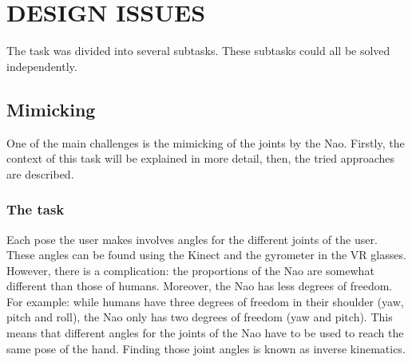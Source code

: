 \documentclass[letterpaper, 10pt, conference]{ieeeconf}
\begin{document}
\section{DESIGN ISSUES}
\label{sec:design}
The task was divided into several subtasks. These subtasks could all be solved independently.
\subsection{Mimicking}
One of the main challenges is the mimicking of the joints by the Nao. Firstly, the context of this task will be explained in more detail, then, the tried approaches are described.
\subsubsection{The task}
Each pose the user makes involves angles for the different joints of the user. These angles can be found using the Kinect and the gyrometer in the VR glasses. However, there is a complication: the proportions of the Nao are somewhat different than those of humans. Moreover, the Nao has less degrees of freedom. For example: while humans have three degrees of freedom in their shoulder (yaw, pitch and roll), the Nao only has two degrees of freedom (yaw and pitch). 
This means that different angles for the joints of the Nao have to be used to reach the same pose of the hand. Finding those joint angles is known as inverse kinematics.
\end{document}
